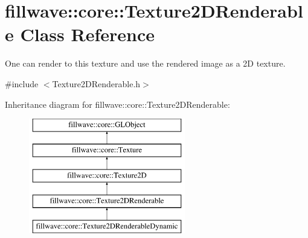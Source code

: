 \hypertarget{classfillwave_1_1core_1_1Texture2DRenderable}{}\section{fillwave\+:\+:core\+:\+:Texture2\+D\+Renderable Class Reference}
\label{classfillwave_1_1core_1_1Texture2DRenderable}


One can render to this texture and use the rendered image as a 2\+D texture.  




{\ttfamily \#include $<$Texture2\+D\+Renderable.\+h$>$}

Inheritance diagram for fillwave\+:\+:core\+:\+:Texture2\+D\+Renderable\+:\begin{figure}[H]
\begin{center}
\leavevmode
\includegraphics[height=5.000000cm]{classfillwave_1_1core_1_1Texture2DRenderable}
\end{center}
\end{figure}
